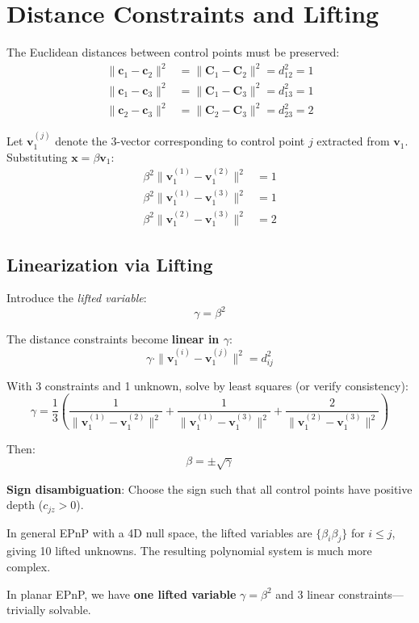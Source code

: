 \documentclass[11pt]{article}
\newcommand{\vect}[1]{\mathbf{#1}}
\begin{document}
\section{Distance Constraints and Lifting}

The Euclidean distances between control points must be preserved:
\begin{align}
\|\vect{c}_1 - \vect{c}_2\|^2 &= \|\vect{C}_1 - \vect{C}_2\|^2 = d_{12}^2 = 1 \\
\|\vect{c}_1 - \vect{c}_3\|^2 &= \|\vect{C}_1 - \vect{C}_3\|^2 = d_{13}^2 = 1 \\
\|\vect{c}_2 - \vect{c}_3\|^2 &= \|\vect{C}_2 - \vect{C}_3\|^2 = d_{23}^2 = 2
\end{align}

Let $\vect{v}_1^{(j)}$ denote the 3-vector corresponding to control point $j$ extracted from $\vect{v}_1$. Substituting $\vect{x} = \beta\vect{v}_1$:
\begin{align}
\beta^2 \|\vect{v}_1^{(1)} - \vect{v}_1^{(2)}\|^2 &= 1 \\
\beta^2 \|\vect{v}_1^{(1)} - \vect{v}_1^{(3)}\|^2 &= 1 \\
\beta^2 \|\vect{v}_1^{(2)} - \vect{v}_1^{(3)}\|^2 &= 2
\end{align}

\subsection{Linearization via Lifting}

Introduce the \emph{lifted variable}:
\[
\gamma = \beta^2
\]

The distance constraints become \textbf{linear in $\gamma$}:
\[
\gamma \cdot \|\vect{v}_1^{(i)} - \vect{v}_1^{(j)}\|^2 = d_{ij}^2
\]

With 3 constraints and 1 unknown, solve by least squares (or verify consistency):
\[
\gamma = \frac{1}{3}\left( \frac{1}{\|\vect{v}_1^{(1)} - \vect{v}_1^{(2)}\|^2} + \frac{1}{\|\vect{v}_1^{(1)} - \vect{v}_1^{(3)}\|^2} + \frac{2}{\|\vect{v}_1^{(2)} - \vect{v}_1^{(3)}\|^2} \right)
\]

Then:
\[
\beta = \pm\sqrt{\gamma}
\]

\textbf{Sign disambiguation}: Choose the sign such that all control points have positive depth ($c_{jz} > 0$).

\begin{planarbox}
In general EPnP with a 4D null space, the lifted variables are $\{\beta_i\beta_j\}$ for $i \leq j$, giving 10 lifted unknowns. The resulting polynomial system is much more complex.

In planar EPnP, we have \textbf{one lifted variable} $\gamma = \beta^2$ and 3 linear constraints---trivially solvable.
\end{planarbox}
\end{document}
